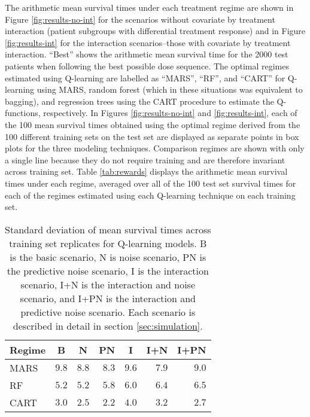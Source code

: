 \documentclass[12pt]{article}
\begin{document}
The arithmetic mean survival times under each treatment regime are shown in Figure \ref{fig:results-no-int} for the scenarios without covariate by treatment interaction (patient subgroups with differential treatment response) and in Figure \ref{fig:results-int} for the interaction scenarios--those with covariate by treatment interaction. ``Best'' shows the arithmetic mean survival time for the 2000 test patients when following the best possible dose sequence. The optimal regimes estimated using Q-learning are labelled as ``MARS'', ``RF'', and ``CART'' for Q-learning using MARS, random forest (which in these situations was equivalent to bagging), and regression trees using the CART procedure to estimate the Q-functions, respectively. In Figures \ref{fig:results-no-int} and \ref{fig:results-int}, each of the 100 mean survival times obtained using the optimal regime derived from the 100 different training sets on the test set are displayed as separate points in box plots for the three modeling techniques. Comparison regimes are shown with only a single line because they do not require training and are therefore invariant across training set. Table \ref{tab:rewards} displays the arithmetic mean survival times under each regime, averaged over all of the 100 test set survival times for each of the regimes estimated using each Q-learning technique on each training set.

\begin{table}[!htbp]
\caption[Standard deviation of mean survival times across training sets]{Standard deviation of mean survival times across training set replicates for Q-learning models. B is the basic scenario, N is noise scenario, PN is the predictive noise scenario, I is the interaction scenario, I+N is the interaction and noise scenario, and I+PN is the interaction and predictive noise scenario. Each scenario is described in detail in section \ref{sec:simulation}. \label{tab:sd-train-rewards}}
\begin{center}
\begin{tabular}{lrrrrrr}
\toprule
\multicolumn{1}{c}{Regime}&\multicolumn{1}{c}{B}&\multicolumn{1}{c}{N}&\multicolumn{1}{c}{PN}&\multicolumn{1}{c}{I}&\multicolumn{1}{c}{I+N}&\multicolumn{1}{c}{I+PN}\tabularnewline
\midrule
MARS&$9.8$&$8.8$&$8.3$&$9.6$&$7.9$&$9.0$\tabularnewline
RF&$5.2$&$5.2$&$5.8$&$6.0$&$6.4$&$6.5$\tabularnewline
CART&$3.0$&$2.5$&$2.2$&$4.0$&$3.2$&$2.7$\tabularnewline
\bottomrule
\end{tabular}
\end{center}
\end{table}
\end{document}
